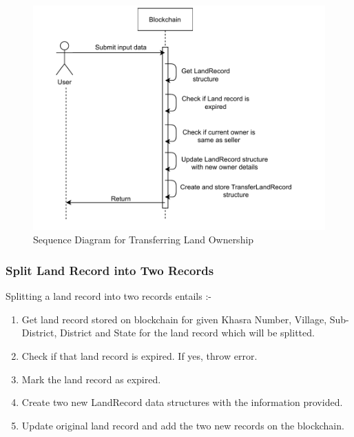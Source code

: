 \documentclass{article}
\begin{document}
        \begin{figure}[htbp]
            \includegraphics[scale=0.25]{blockchain_seq_transfer_land}
            \centering
            \caption{Sequence Diagram for Transferring Land Ownership}
        \end{figure}

    \subsubsection{Split Land Record into Two Records}
        Splitting a land record into two records entails :-
        \begin{enumerate}
            \item Get land record stored on blockchain for given Khasra Number, Village, Sub-District, District and State for the land record which will be splitted.
            \item Check if that land record is expired. If yes, throw error.
            \item Mark the land record as expired.
            \item Create two new LandRecord data structures with the information provided.
            \item Update original land record and add the two new records on the blockchain. 
        \end{enumerate}
\end{document}
